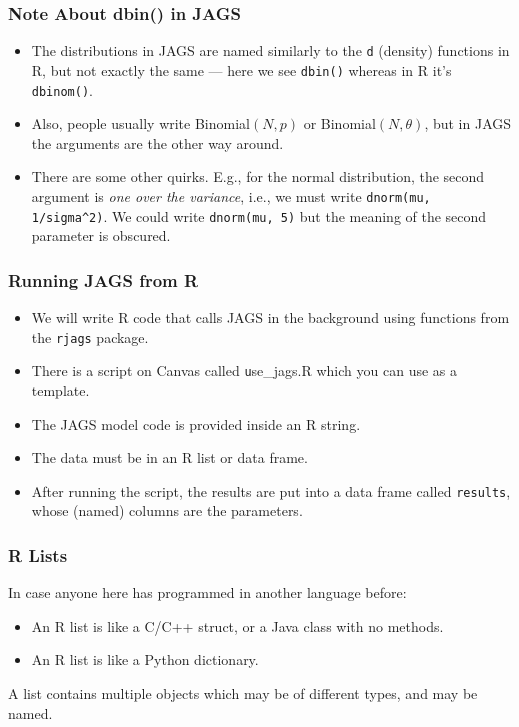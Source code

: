 \documentclass{beamer}
\begin{document}
\begin{frame}[fragile]
\frametitle{Note About dbin() in JAGS}

\begin{itemize}
\item The distributions in JAGS are named similarly to the \texttt{d}
(density) functions in R, but not exactly the same --- here we see
\texttt{dbin()} whereas in R it's \texttt{dbinom()}.\pause
\item Also, people usually write Binomial$(N, p)$ or Binomial$(N, \theta)$,
but in JAGS the arguments are the other way around.\pause
\item There are some other quirks. E.g., for the normal distribution, the
second argument is {\em one over the variance}, i.e., we must write
\texttt{dnorm(mu, 1/sigma^2)}. 
We could write \texttt{dnorm(mu, 5)}
but the meaning of the second parameter is obscured.
\end{itemize}

\end{frame}



\begin{frame}[fragile]
\frametitle{Running JAGS from R}

\begin{itemize}
\item We will write R code that calls JAGS in the background using functions
from the \texttt{rjags} package.\pause
\item There is a script on Canvas called {\texttt use\_jags.R} which you can
use as a template.\pause
\item The JAGS model code is provided inside an R string.\pause
\item The data must be in an R list or data frame.\pause
\item After running the script, the results are put into a data frame called
\texttt{results}, whose (named) columns are the parameters.
\end{itemize}

\end{frame}

\begin{frame}
\frametitle{R Lists}
In case anyone here has programmed in another
language before:
\begin{itemize}
\item An R list is like a C/C++ struct, or a Java class with no methods.\pause
\item An R list is like a Python dictionary.
\end{itemize}

\pause
A list contains multiple objects which may be of different types, and may be
named.
\end{frame}
\end{document}
